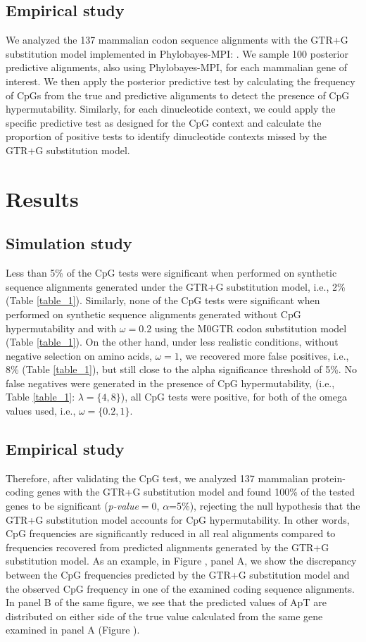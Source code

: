 \documentclass{article}
\begin{document}
\subsection*{Empirical study}
We analyzed the 137 mammalian codon sequence alignments with the GTR+G substitution model implemented in Phylobayes-MPI: \citep{Lartillot2013}.  We sample 100 posterior predictive alignments, also using Phylobayes-MPI, for each mammalian gene of interest.  We then apply the posterior predictive test by calculating the frequency of CpGs from the true and predictive alignments to detect the presence of CpG hypermutability. Similarly, for each dinucleotide context, we could apply the specific predictive test as designed for the CpG context and calculate the proportion of positive tests to identify dinucleotide contexts missed by the GTR+G substitution model.

\section*{Results}
\subsection*{Simulation study}
Less than 5\% of the CpG tests were significant when performed on synthetic sequence alignments generated under the GTR+G substitution model, i.e., 2\% (Table \ref{table_1}).  Similarly, none of the CpG tests were significant when performed on synthetic sequence alignments generated without CpG hypermutability and with $\omega = 0.2$ using the M0GTR codon substitution model (Table \ref{table_1}). On the other hand, under less realistic conditions, without negative selection on amino acids, $\omega=1$, we recovered more false positives, i.e., 8\% (Table \ref{table_1}), but still close to the alpha significance threshold of 5\%. No false negatives were generated in the presence of CpG hypermutability, (i.e., Table \ref{table_1}: $\lambda = \{4,8\}$), all CpG tests were positive, for both of the omega values used, i.e., $\omega = \{0.2,1\}$.

\subsection*{Empirical study}
Therefore, after validating the CpG test, we analyzed 137 mammalian protein-coding genes with the GTR+G substitution model and found 100\% of the tested genes to be significant (\emph{p-value}$=0$, $\alpha$=5\%), rejecting the null hypothesis that the GTR+G substitution model accounts for CpG hypermutability.  In other words, CpG frequencies are significantly reduced in all real alignments compared to frequencies recovered from predicted alignments generated by the GTR+G substitution model. As an example, in Figure , panel A, we show the discrepancy between the CpG frequencies predicted by the GTR+G substitution model and the observed CpG frequency in one of the examined coding sequence alignments. In panel B of the same figure, we see that the predicted values of ApT are distributed on either side of the true value calculated from the same gene examined in panel A (Figure ).
\end{document}
